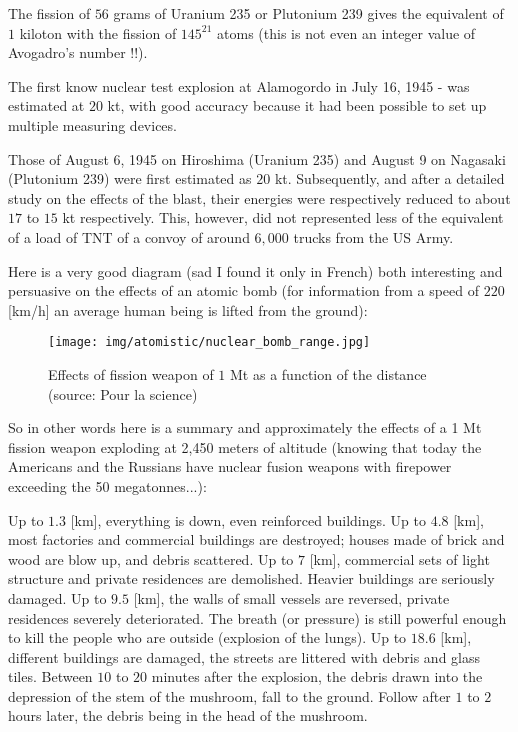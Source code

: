 	The fission of $56$ grams of Uranium 235 or Plutonium 239 gives the equivalent of $1$ kiloton with the fission of $145^{21}$ atoms (this is not even an integer value of Avogadro's number !!).
	
	The first know nuclear test explosion at Alamogordo in July 16, 1945 - was estimated at $20$ kt, with good accuracy because it had been possible to set up multiple measuring devices.
	
	Those of August 6, 1945 on Hiroshima (Uranium 235) and August 9 on Nagasaki (Plutonium 239) were first estimated as $20$ kt. Subsequently, and after a detailed study on the effects of the blast, their energies were respectively reduced to about $17$ to $15$ kt respectively. This, however, did not represented less of the equivalent of a load of TNT of a convoy of around $6,000$ trucks from the US Army.
	
	Here is a very good diagram (sad I found it only in French) both interesting and persuasive on the effects of an atomic bomb (for information from a speed of $220$ [km/h] an average human being is lifted from the ground):
	\begin{figure}[H]
		\begin{center}
		\texttt{[image: img/atomistic/nuclear\_bomb\_range.jpg]}
		\end{center}	
		\caption[Effects of fission weapon of $1$ Mt as a function of the distance]{Effects of fission weapon of $1$ Mt as a function of the distance (source: Pour la science)}
	\end{figure}
	So in other words here is a summary and approximately the effects of a 1 Mt fission weapon exploding at 2,450 meters of altitude (knowing that today the Americans and the Russians have nuclear fusion weapons with firepower exceeding the 50 megatonnes...):
	
	Up to $1.3$ [km], everything is down, even reinforced buildings. Up to $4.8$ [km], most factories and commercial buildings are destroyed; houses made of brick and wood are blow up, and debris scattered. Up to $7$ [km], commercial sets of light structure and private residences are demolished. Heavier buildings are seriously damaged. Up to $9.5$ [km], the walls of small vessels are reversed, private residences severely deteriorated. The breath (or pressure) is still powerful enough to kill the people who are outside (explosion of the lungs). Up to $18.6$ [km], different buildings are damaged, the streets are littered with debris and glass tiles. Between $10$ to $20$ minutes after the explosion, the debris drawn into the depression of the stem of the mushroom, fall to the ground. Follow after $1$ to $2$ hours later, the debris being in the head of the mushroom.
	
